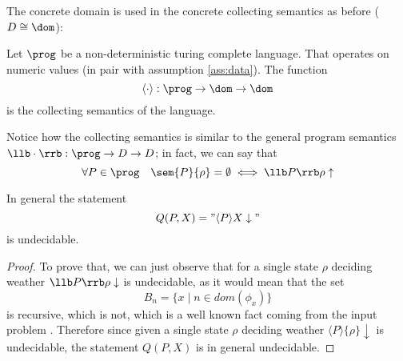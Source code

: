 The concrete domain is used in the concrete collecting semantics as
before (\(D \cong \dom\)):

\begin{definition}\label{def:collecting}
  Let \(\prog\) be a non-deterministic turing complete language. That
  operates on numeric values (in pair with assumption
  \ref{ass:data}). The function \[\langle \cdot \rangle : \prog \to
  \dom \to \dom\] is the collecting semantics of the language.
\end{definition}

Notice how the collecting semantics is similar to the general program
semantics \(\llb \cdot \rrb : \prog \to D \to D\); in fact, we can say
that \[\forall P \in \prog \quad \sem{P} \{\rho\} = \emptyset \iff
\llb P \rrb \rho \uparrow\]

\begin{lemma}\label{le:collectingundec}
  In general the statement \[Q(P,X) = "\langle P \rangle X
  \downarrow"\] is undecidable.
\end{lemma}

\begin{proof}
  To prove that, we can just observe that for a single state \(\rho\)
  deciding weather \(\llb P \rrb \rho \downarrow\) is undecidable, as
  it would mean that the set \[B_n = \{x \mid n \in dom(\phi_x)\}\] is
  recursive, which is not, which is a well known fact coming from the
  input problem \cite[p.~104]{cutland1980computability}. Therefore
  since given a single state \(\rho\) deciding weather \(\langle P
  \rangle\{\rho\}\downarrow\) is undecidable, the statement \(Q(P,X)\)
  is in general undecidable.
\end{proof}





